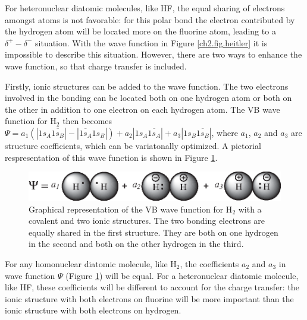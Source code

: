 For heteronuclear diatomic molecules, like HF, the equal sharing of electrons amongst atoms is not favorable: for this polar bond the electron contributed by the hydrogen atom will be located more on the fluorine atom, leading to a $\delta^{+}-\delta^{-}$ situation. With the wave function in Figure \ref{ch2.fig.heitler} it is impossible to describe this situation. However, there are two ways to enhance the wave function, so that charge transfer is included.

Firstly, ionic structures can be added to the wave function. The two electrons involved in the bonding can be located both on one hydrogen atom or both on the other in addition to one electron on each hydrogen atom. The VB wave function for H$_2$ then becomes $\Psi=a_1(|1s_{A}\overline{1s_{B}}| - |\overline{1s_{A}}1s_{B}|) + a_2 |1s_{A}\overline{1s_{A}}| + a_3 |1s_{B}\overline{1s_{B}}|$, where $a_1$, $a_2$ and $a_3$ are structure coefficients, which can be variatonally optimized. A pictorial respresentation of this wave function is shown in Figure \ref{ch2.fig.heitlerplus}.
\begin{figure}[ht]
\center
\includegraphics{orbopt/figures/heitlerplus.eps}
\caption{Graphical representation of the VB wave function for H$_2$ with a covalent and two ionic structures. The two bonding electrons are equally shared in the first structure. They are both on one hydrogen in the second and both on the other hydrogen in the third.}
\label{ch2.fig.heitlerplus}
\end{figure}
For any homonuclear diatomic molecule, like H$_2$, the coefficients $a_2$ and $a_3$ in wave function $\Psi$ (Figure \ref{ch2.fig.heitlerplus}) will be equal. For a heteronuclear diatomic molecule, like HF, these coefficients will be different to account for the charge transfer: the ionic structure with both electrons on fluorine will be more important than the ionic structure with both electrons on hydrogen. 

